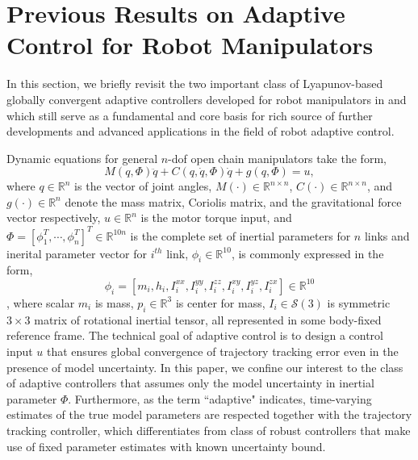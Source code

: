 \documentclass[letterpaper, 10 pt, conference]{ieeeconf}  %
\begin{document}
\section{Previous Results on Adaptive Control for Robot Manipulators}

In this section, we briefly revisit the two important class of Lyapunov-based globally convergent adaptive controllers developed for robot manipulators in \cite{Craig_AdaptiveControl} and \cite{Slotine_AdaptiveControl} which still serve as a fundamental and core basis for rich source of further developments and advanced applications in the field of robot adaptive control.

Dynamic equations for general $n$-dof open chain manipulators take the form,
\begin{equation}
M(q,\Phi)\ddot{q}+C(q,\dot{q},\Phi)\dot{q} + g(q,\Phi) = u, \label{dynamics}
\end{equation}
where $q\in\mathbb{R}^n$ is the vector of joint angles, $M(\cdot)\in\mathbb{R}^{n\times n}$, $C(\cdot)\in\mathbb{R}^{n\times n}$, and $g(\cdot)\in\mathbb{R}^{n}$ denote the mass matrix, Coriolis matrix, and the gravitational force vector respectively, $u\in\mathbb{R}^{n}$ is the motor torque input, and $\Phi = [\phi_{1}^{T}, \cdots, \phi_{n}^{T}]^{T}\in\mathbb{R}^{10n}$ is the complete set of inertial parameters for $n$ links and inerital parameter vector for $i^{th}$ link, $\phi_i\in\mathbb{R}^{10}$, is commonly expressed in the form,
\begin{equation*}
\phi_{i} = [m_i,h_i,I_i^{xx},I_i^{yy},I_i^{zz},I_i^{xy},I_i^{yz},I_i^{zx}]\in\mathbb{R}^{10}
\end{equation*}
, where scalar $m_i$ is mass, $p_i\in\mathbb{R}^3$ is center for mass, $I_i\in\mathcal{S}(3)$ is symmetric $3\times 3$ matrix of rotational inertial tensor, all represented in some body-fixed reference frame.
The technical goal of adaptive control is to design a control input $u$ that ensures global convergence of trajectory tracking error even in the presence of model uncertainty. In this paper, we confine our interest to the class of adaptive controllers that assumes only the model uncertainty in inertial parameter $\Phi$. Furthermore, as the term ``adaptive"  indicates, time-varying estimates of the true model parameters are respected together with the trajectory tracking controller, which differentiates from class of robust controllers that make use of fixed parameter estimates with known uncertainty bound.

\end{document}
